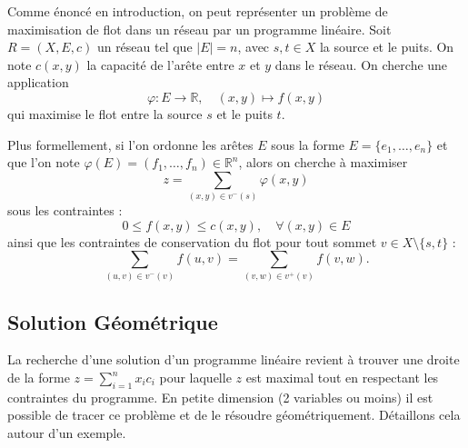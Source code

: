 \begin{proposition}
    Comme énoncé en introduction, on peut représenter un problème de maximisation de flot dans un réseau par 
    un programme linéaire. Soit $R = (X, E, c)$ un réseau tel que $|E| = n$, avec $s, t \in X$ la source et le puits. 
    On note $c(x,y)$ la capacité de l’arête entre $x$ et $y$ dans le réseau. 
    On cherche une application 
        \[  \varphi : E \longrightarrow \mathbb{R}, \quad (x,y) \longmapsto f(x,y) \]
    qui maximise le flot entre la source $s$ et le puits $t$. 

    Plus formellement, si l’on ordonne les arêtes $E$ sous la forme $E = \{e_1, \dots, e_n\}$ et que l’on note 
    $\varphi(E) = (f_1, \dots, f_n) \in \mathbb{R}^n$, alors on cherche à maximiser 
        \[ z = \sum_{(x,y) \in v^-(s)} \varphi(x,y) \]
    sous les contraintes :
        \[ 0 \leqslant f(x,y) \leqslant c(x,y), \quad \forall (x,y) \in E \]
    ainsi que les contraintes de conservation du flot pour tout sommet $v \in X \setminus \{s, t\}$ :
        \[ \sum_{(u,v) \in v^-(v)} f(u,v) = \sum_{(v,w) \in v^+(v)} f(v,w).\]
\end{proposition}

\subsection{Solution Géométrique}

La recherche d'une solution d'un programme linéaire revient à trouver une droite de la forme $ z = \sum_{i=1}^{n} x_i c_i $
pour laquelle $z$ est maximal tout en respectant les contraintes du programme. 
En petite dimension (2 variables ou moins) il est possible de tracer ce problème et de le résoudre géométriquement. 
Détaillons cela autour d'un exemple. 


